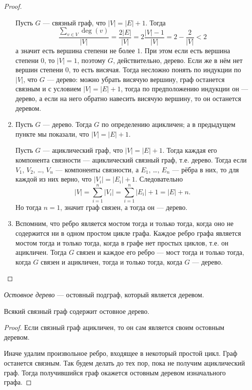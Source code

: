 \documentclass[12pt,a4paper]{article}
\begin{document}
\begin{proof}
\begin{enumerate}
            Пусть $G$ --- связный граф, что $|V| = |E| + 1$. Тогда
            \[\frac{\sum_{v \in V} \deg(v)}{|V|} = \frac{2|E|}{|V|} = 2\frac{|V|-1}{|V|} = 2 - \frac{2}{|V|} < 2\]
            а значит есть вершина степени не более $1$. При этом если есть вершина степени $0$, то $|V| = 1$, поэтому $G$, действительно, дерево. Если же в нём нет вершин степени $0$, то есть висячая. Тогда несложно понять по индукции по $|V|$, что $G$ --- дерево: можно убрать висячую вершину, граф останется связным и с условием $|V| = |E| + 1$, тогда по предположению индукции он --- дерево, а если на него обратно навесить висячую вершину, то он останется деревом.

            \item Пусть $G$ --- дерево. Тогда $G$ по определению ацикличен; а в предыдущем пункте мы показали, что $|V| = |E| + 1$.
            
            Пусть $G$ --- ациклический граф, что $|V| = |E| + 1$. Тогда каждая его компонента связности --- ациклический связный граф, т.е. дерево. Тогда если $V_1$, $V_2$, \dots, $V_n$ --- компоненты связности, а $E_1$, \dots, $E_n$ --- рёбра в них, то для каждой из них верно, что $|V_i| = |E_i| + 1$. Следовательно
            \[|V| = \sum_{i=1}^n |V_i| = \sum_{i=1}^n |E_i| + 1 = |E| + n.\]
            Но тогда $n=1$, значит граф связен, а тогда он --- дерево.

            \item Вспомним, что ребро является мостом тогда и только тогда, когда оно не содержится ни в одном простом цикле графа. Каждое ребро графа является мостом тогда и только тогда, когда в графе нет простых циклов, т.е. он ацикличен. Тогда $G$ связен и каждое его ребро --- мост тогда и только тогда, когда $G$ связен и ацикличен, тогда и только тогда, когда $G$ --- дерево.
        \end{enumerate}
    \end{proof}

    \begin{definition}
        \emph{Остовное дерево} --- остовный подграф, который является деревом.
    \end{definition}

    \begin{lemma}
        Всякий связный граф содержит остовное дерево.
    \end{lemma}

    \begin{proof}
        Если связный граф ацикличен, то он сам является своим остовным деревом.

        Иначе удалим произвольное ребро, входящее в некоторый простой цикл. Граф останется связным. Так будем делать до тех пор, пока не получим ациклический граф. Тогда получившийся граф окажется остовным деревом изначального графа.
    \end{proof}
\end{document}
